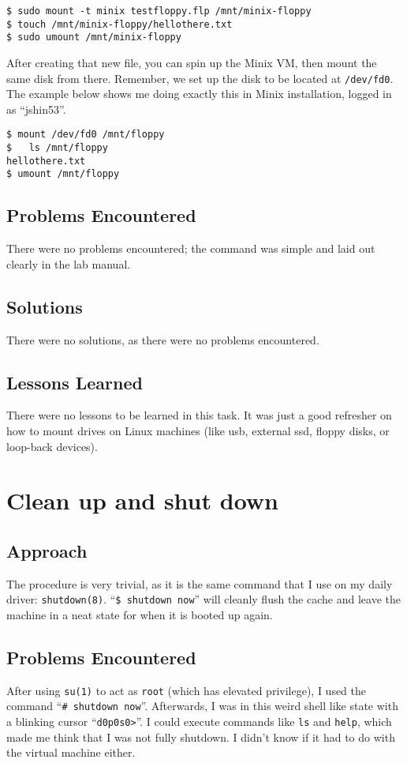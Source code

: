 \documentclass[11pt]{article}
\begin{document}
\begin{verbatim}
$ sudo mount -t minix testfloppy.flp /mnt/minix-floppy
$ touch /mnt/minix-floppy/hellothere.txt
$ sudo umount /mnt/minix-floppy
\end{verbatim}

After creating that new file, you can spin up the {\sc Minix} VM, then mount the same disk from there. Remember, we set up the disk to be located at {\tt/dev/fd0}. The example below shows me doing exactly this in {\sc Minix} installation, logged in as ``jshin53''.

\begin{verbatim}
$ mount /dev/fd0 /mnt/floppy
$	ls /mnt/floppy
hellothere.txt
$ umount /mnt/floppy
\end{verbatim}

\subsection{Problems Encountered}
There were no problems encountered; the command was simple and laid out clearly in the lab manual.

\subsection{Solutions}
There were no solutions, as there were no problems encountered.

\subsection{Lessons Learned}
There were no lessons to be learned in this task. It was just a good refresher on how to mount drives on Linux machines (like usb, external ssd, floppy disks, or loop-back devices).

\section{Clean up and shut down}
\subsection{Approach}
The procedure is very trivial, as it is the same command that I use on my daily driver: {\tt shutdown(8)}. ``{\tt \$ shutdown now}'' will cleanly flush the cache and leave the machine in a neat state for when it is booted up again.

\subsection{Problems Encountered}
After using {\tt su(1)} to act as {\tt root} (which has elevated privilege), I used the command ``{\tt \# shutdown now}''. Afterwards, I was in this weird shell like state with a blinking cursor ``{\tt d0p0s0>}''. I could execute commands like {\tt ls} and {\tt help}, which made me think that I was not fully shutdown. I didn't know if it had to do with the virtual machine either.
\end{document}
